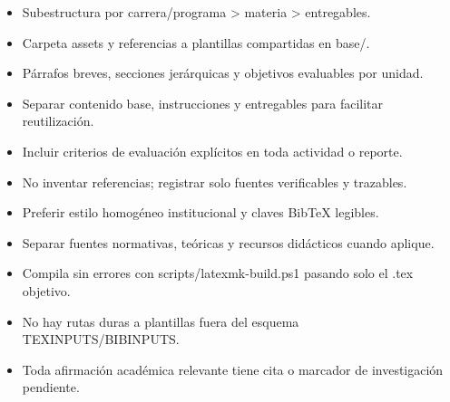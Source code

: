 \documentclass[12pt]{article}
\begin{document}
\begin{itemize}[leftmargin=*]
  \item Subestructura por carrera/programa > materia > entregables.
  \item Carpeta assets y referencias a plantillas compartidas en base/.
  \item Párrafos breves, secciones jerárquicas y objetivos evaluables por unidad.
  \item Separar contenido base, instrucciones y entregables para facilitar reutilización.
  \item Incluir criterios de evaluación explícitos en toda actividad o reporte.
  \item No inventar referencias; registrar solo fuentes verificables y trazables.
  \item Preferir estilo homogéneo institucional y claves BibTeX legibles.
  \item Separar fuentes normativas, teóricas y recursos didácticos cuando aplique.
  \item Compila sin errores con scripts/latexmk-build.ps1 pasando solo el .tex objetivo.
  \item No hay rutas duras a plantillas fuera del esquema TEXINPUTS/BIBINPUTS.
  \item Toda afirmación académica relevante tiene cita o marcador de investigación pendiente.
\end{itemize}
\end{document}
